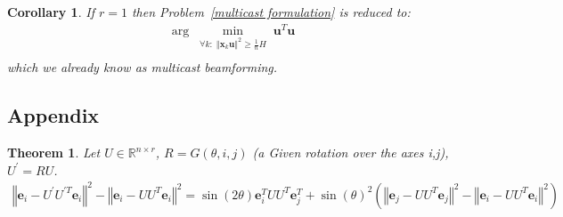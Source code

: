\documentclass{article}
\newtheorem{theorem}{Theorem}
\newtheorem{corollary}{Corollary}
\newcommand{\probref}[1]{Problem~\ref{#1}}
\newcommand{\x}{{\mathbf x}}
\renewcommand{\u}{{\mathbf u}}
\newcommand{\e}{{\mathbf e}}
\begin{document}
\begin{corollary}
If $r=1$ then \probref{multicast formulation} is reduced to:
\begin{align*} 
    \arg\min_{\begin{array}{c}
    \forall k:\;\left\Vert \x_{k}\u\right\Vert ^{2}\ge\frac{1}{n}H\\
    \end{array}}\u^T\u
\end{align*}
which we already know as multicast beamforming.
\end{corollary}

\subsection{Appendix} \label{technical proof}
\begin{theorem}
Let $U\in\mathbb{R}^{n\times r}$, $R=G(\theta,i,j)$ (a Given rotation over the axes i,j), $U^{'}=RU$.
\begin{align*}
    \left\Vert \e_{i}-U^{'}U^{'T}\e_{i}\right\Vert ^{2}-\left\Vert \e_{i}-UU^{T}\e_{i}\right\Vert ^{2}= \sin\left(2\theta\right)\e_{i}^{T}UU^{T}\e_{j}^{T}+\sin\left(\theta\right)^{2}\left(\left\Vert \e_{j}-UU^{T}\e_{j}\right\Vert ^{2}-\left\Vert \e_{i}-UU^{T}\e_{i}\right\Vert ^{2}\right)
\end{align*}
\end{theorem}
\end{document}
